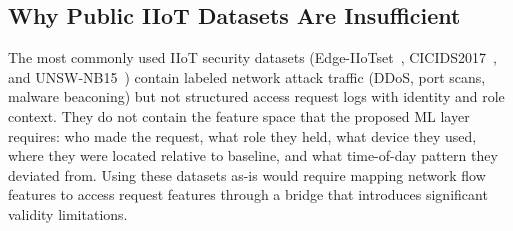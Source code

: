 \documentclass[conference]{IEEEtran}
\begin{document}
\subsection{Why Public IIoT Datasets Are Insufficient}

The most commonly used IIoT security datasets (Edge-IIoTset~\cite{edgeiiotset2022}, CICIDS2017~\cite{cicids2017}, and UNSW-NB15~\cite{unswnb15}) contain labeled network attack traffic (DDoS, port scans, malware beaconing) but not structured access request logs with identity and role context. They do not contain the feature space that the proposed ML layer requires: who made the request, what role they held, what device they used, where they were located relative to baseline, and what time-of-day pattern they deviated from. Using these datasets as-is would require mapping network flow features to access request features through a bridge that introduces significant validity limitations.
\end{document}
